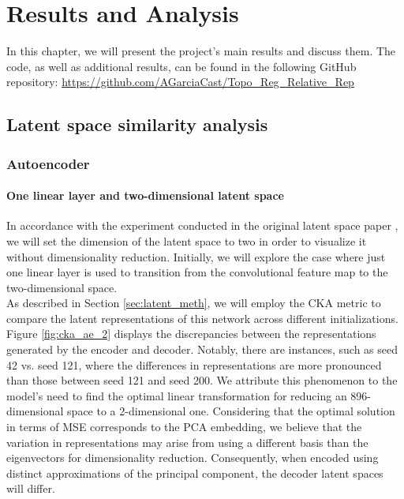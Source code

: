 \documentclass[../main.tex]{subfiles}
\begin{document}
\chapter{Results and Analysis}
\label{ch:resultsAndAnalysis}


In this chapter, we will present the project's main results and discuss them. The code, as well as additional results, can be found in the following GitHub repository: \url{https://github.com/AGarciaCast/Topo_Reg_Relative_Rep}


\section{Latent space similarity analysis}
\label{sec:res_lat}
\subsection{Autoencoder}
\subsubsection*{One linear layer and two-dimensional latent space}

In accordance with the experiment conducted in the original latent space paper \cite{moschella_relative_2022}, we will set the dimension of the latent space to two in order to visualize it without dimensionality reduction. Initially, we will explore the case where just one linear layer is used to transition from the convolutional feature map to the two-dimensional space.\\

As described in Section \ref{sec:latent_meth}, we will employ the CKA metric to compare the latent representations of this network across different initializations. Figure \ref{fig:cka_ae_2} displays the discrepancies between the representations generated by the encoder and decoder. Notably, there are instances, such as seed 42 vs. seed 121, where the differences in representations are more pronounced than those between seed 121 and seed 200. We attribute this phenomenon to the model's need to find the optimal linear transformation for reducing an 896-dimensional space to a 2-dimensional one. Considering that the optimal solution in terms of MSE corresponds to the PCA embedding, we believe that the variation in representations may arise from using a different basis than the eigenvectors for dimensionality reduction. Consequently, when encoded using distinct approximations of the principal component, the decoder latent spaces will differ.\\
\end{document}
